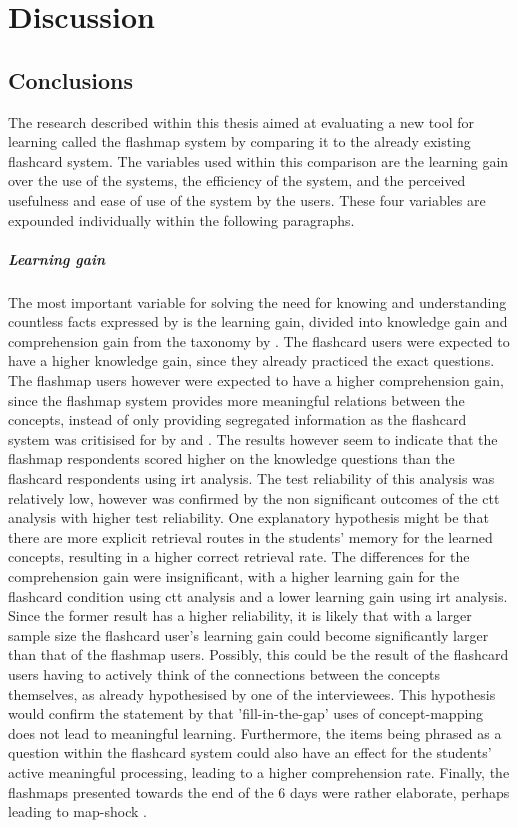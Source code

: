 \chapter{Discussion}
\label{ch:discussion}

\section{Conclusions}

The research described within this thesis aimed at evaluating a new tool for learning called the flashmap system by comparing it to the already existing flashcard system. The variables used within this comparison are the learning gain over the use of the systems, the efficiency of the system, and the perceived usefulness and ease of use of the system by the users. These four variables are expounded individually within the following paragraphs.

\paragraph{Learning gain} The most important variable for solving the need for knowing and understanding countless facts expressed by  is the learning gain, divided into knowledge gain and comprehension gain from the taxonomy by . The flashcard users were expected to have a higher knowledge gain, since they already practiced the exact questions. The flashmap users however were expected to have a higher comprehension gain, since the flashmap system provides more meaningful relations between the concepts, instead of only providing segregated information as the flashcard system was critisised for by  and . The results however seem to indicate that the flashmap respondents scored higher on the knowledge questions than the flashcard respondents using irt analysis. The test reliability of this analysis was relatively low, however was confirmed by the non significant outcomes of the ctt analysis with higher test reliability. One explanatory hypothesis might be that there are more explicit retrieval routes in the students' memory for the learned concepts, resulting in a higher correct retrieval rate. The differences for the comprehension gain were insignificant, with a higher learning gain for the flashcard condition using ctt analysis and a lower learning gain using irt analysis. Since the former result has a higher reliability, it is likely that with a larger sample size the flashcard user's learning gain could become significantly larger than that of the flashmap users. Possibly, this could be the result of the flashcard users having to actively think of the connections between the concepts themselves, as already hypothesised by one of the interviewees. This hypothesis would confirm the statement by  that 'fill-in-the-gap' uses of concept-mapping does not lead to meaningful learning. Furthermore, the items being phrased as a question within the flashcard system could also have an effect for the students' active meaningful processing, leading to a higher comprehension rate. Finally, the flashmaps presented towards the end of the 6 days were rather elaborate, perhaps leading to map-shock \cite{moore}.

